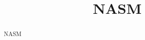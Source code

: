 \documentclass[11pt,twocolumn]{article}
\begin{document}
\title{NASM}
\maketitle{}
\begin{abstract}NASM
\end{abstract}
\vspace{1em}



\end{document}
